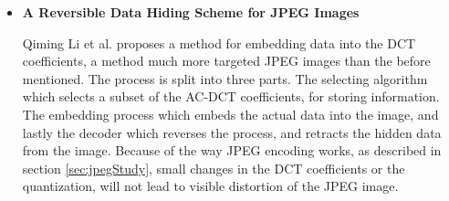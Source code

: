 \begin{itemize}
\begin{itemize}
		\item \textbf{A Reversible Data Hiding Scheme for JPEG Images}
		
		Qiming Li et al. proposes a method for embedding data into the DCT coefficients\citep{Li2010}, a method much more targeted JPEG images than the before mentioned. The process is split into three parts. The selecting algorithm which selects a subset of the AC-DCT coefficients, for storing information. The embedding process which embeds the actual data into the image, and lastly the decoder which reverses the process, and retracts the hidden data from the image. Because of the way JPEG encoding works, as described in section \ref{sec:jpegStudy}, small changes in the DCT coefficients or the quantization, will not lead to visible distortion of the JPEG image.

	\end{itemize}
\end{itemize}
